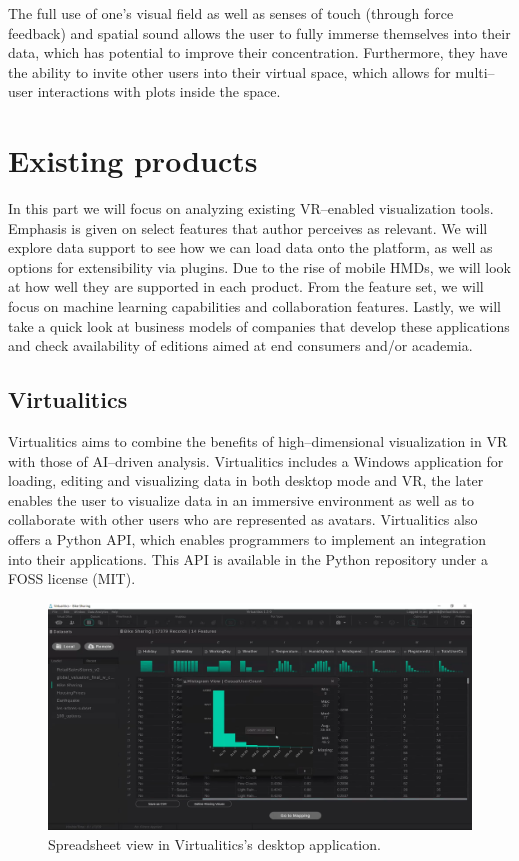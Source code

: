 \documentclass{article}
\begin{document}
The full use of one's visual field as well as senses of touch (through force feedback) and spatial sound allows the user to fully immerse themselves into their data, which has potential to improve their concentration. Furthermore, they have the ability to invite other users into their virtual space, which allows for multi--user interactions with plots inside the space.

\section{Existing products}

In this part we will focus on analyzing existing VR--enabled visualization tools. Emphasis is given on select features that author perceives as relevant. We will explore data support to see how we can load data onto the platform, as well as options for extensibility via plugins. Due to the rise of mobile HMDs, we will look at how well they are supported in each product. From the feature set, we will focus on machine learning capabilities and collaboration features. Lastly, we will take a quick look at business models of companies that develop these applications and check availability of editions aimed at end consumers and/or academia.

\subsection{Virtualitics}

Virtualitics aims to combine the benefits of high--dimensional visualization in VR with those of AI--driven analysis.\cite{virtualitics} Virtualitics includes a Windows application for loading, editing and visualizing data in both desktop mode and VR, the later enables the user to visualize data in an immersive environment as well as to collaborate with other users who are represented as avatars. Virtualitics also offers a Python API, which enables programmers to implement an integration into their applications. This API is available in the Python repository under a FOSS license (MIT).\cite{pyvip}\\

\begin{figure}[!h]
\centering
\includegraphics[scale=0.18]{images/virtualitics_spreadsheet}
\caption{Spreadsheet view in Virtualitics's desktop application.\cite{virtualiticsvideo}}
\label{fig:virtualiticssheet}
\end{figure}
\end{document}
